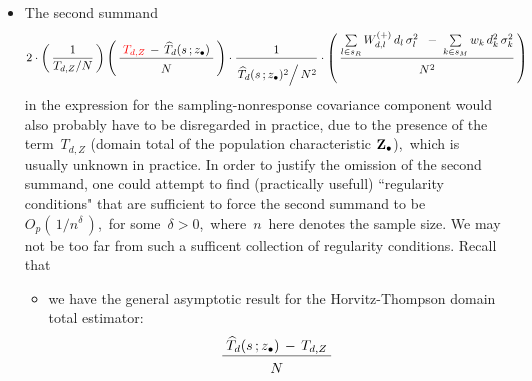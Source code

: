 \begin{itemize}
\begin{itemize}
        \vskip 0.3cm
    \item
        The second summand
        \begin{equation*}
        2
        \cdot
        \left(\,
            \dfrac{1}{T_{d,Z} \slash N}
            \,\right)
        \left(\,
            \dfrac{
                {\color{white}.}
                {\color{red}T_{d,Z}} \,-\, \widehat{T}_{d}(s\,;\zdot)
                {\color{white}.}
                }{
                \overset{{\color{white}.}}{
                    N
                    }
                }           
            \,\right)
        \cdot
        \dfrac{
            1
            }{
            \overset{{\color{white}.}}{
                \left. \widehat{T}_{d}(s\,;\zdot)^{2} \right\slash N^{2}
                }
            }
        \cdot
        \left(\,
            \dfrac{
                \underset{l \in s_{R}}{\sum}\,
                W^{(+)}_{d,l}\,d_{l}\,\sigma_{l}^{2}
                \;\;-\;
                \underset{k \in s_{M}}{\sum}\,
                w_{k}\,d_{k}^{2}\,\sigma_{k}^{2}
                }{
                \overset{{\color{white}.}}{N^{2}}                
                }
            \,\right)
        \end{equation*}
        in the expression for the sampling-nonresponse covariance component
        would also probably have to be disregarded in practice,
        due to the presence of the term \,$T_{d,Z}$
        (domain total of the population characteristic $\mathbf{Z}_{\bullet}$),\,
        which is usually unknown in practice.
        \vskip 0.1cm
        In order to justify the omission of the second summand,
        one could attempt to find (practically usefull) ``regularity conditions"
        that are sufficient to force the second summand to be
        \,$O_{p}\!\left(\,1/n^{\delta}\,\right)$,\,
        for some \,$\delta > 0$,\,
        where \,$n$\, here denotes the sample size.
        We may not be too far from such a sufficent collection of regularity conditions.
        Recall that
        \begin{itemize}
        \item
            we have the general asymptotic result for the Horvitz-Thompson domain total estimator:
            \begin{equation*}
            \dfrac{
                {\color{white}.}
                \widehat{T}_{d}(s\,;\zdot) \,-\, {\color{black}T_{d,Z}}
                {\color{white}.}
                }{
                \overset{{\color{white}.}}{
                    N
                    }
                }

\end{equation*}
\end{itemize}
\end{itemize}
\end{itemize}
